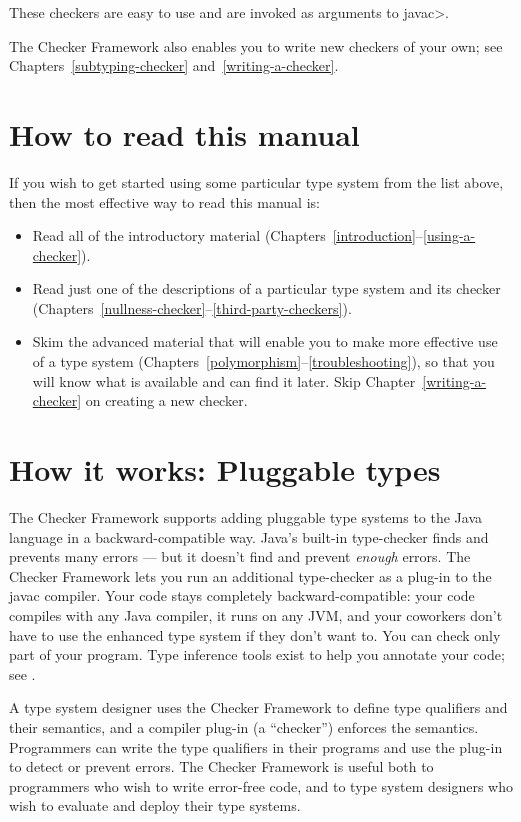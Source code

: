 \noindent
These checkers are easy to use and are invoked as arguments to \<javac>.


The Checker Framework also enables you to write new checkers of your
own; see Chapters~\ref{subtyping-checker} and~\ref{writing-a-checker}.


\section{How to read this manual\label{how-to-read-this-manual}}

If you wish to get started using some particular type system from the list
above, then the most effective way to read this manual is:

\begin{itemize}
\item
  Read all of the introductory material
  (Chapters~\ref{introduction}--\ref{using-a-checker}).
\item
  Read just one of the descriptions of a particular type system and its
  checker (Chapters~\ref{nullness-checker}--\ref{third-party-checkers}).
\item
  Skim the advanced material that will enable you to make more effective
  use of a type system
  (Chapters~\ref{polymorphism}--\ref{troubleshooting}), so that you will
  know what is available and can find it later.  Skip
  Chapter~\ref{writing-a-checker} on creating a new checker.
\end{itemize}


\section{How it works:  Pluggable types\label{pluggable-types}}

The Checker Framework supports adding
pluggable type systems to the Java language in a backward-compatible way.
Java's built-in type-checker finds and prevents many errors --- but it
doesn't find and prevent \emph{enough} errors.  The Checker Framework lets you
run an additional type-checker as a plug-in to the javac compiler.  Your
code stays completely backward-compatible:  your code compiles with any
Java compiler, it runs on any JVM, and your coworkers don't have to use the
enhanced type system if they don't want to.  You can check only part of
your program.  Type inference tools exist to help you annotate your
code; see .


A type system designer uses the Checker Framework to define type qualifiers
and their semantics, and a
compiler plug-in (a ``checker'') enforces the semantics.  Programmers can
write the type qualifiers in their programs and use the plug-in to detect
or prevent errors.  The Checker Framework is useful both to programmers who
wish to write error-free code, and to type system designers who wish to
evaluate and deploy their type systems.



